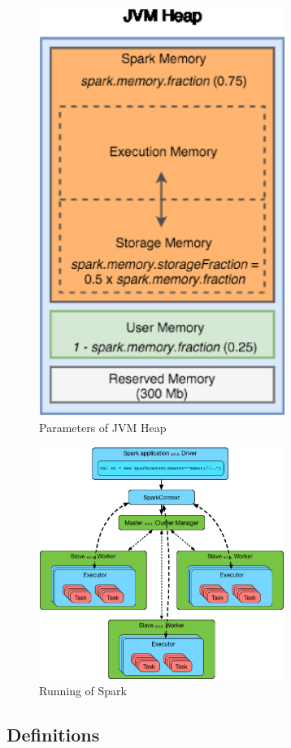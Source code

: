 \begin{figure}
	\includegraphics[width=8cm]{3.eps}
	\caption{Parameters of JVM Heap}\label{fig:ParametersJVM}
\end{figure}

\begin{figure}
	\includegraphics[width=8cm]{4.eps}
	\caption{Running of Spark}\label{fig:RunningSpark}
\end{figure}


\subsection{Definitions}

